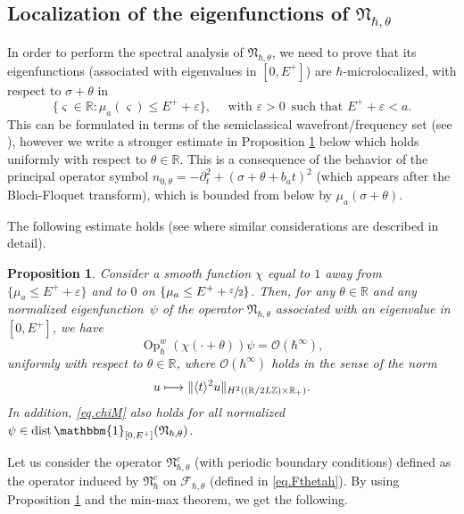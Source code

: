 \documentclass[10pt]{amsart}
\newcommand\mto{\mathchoice{\longmapsto}{\mapsto}{\mapsto}{\mapsto}}
\let\sep:
\let\epsilon\varepsilon
\DeclareMathOperator{\dist}{dist}
\DeclareMathOperator{\Op}{Op}
\let\mathds\mathbbm
\theoremstyle{plain}
\newtheorem{proposition}[theorem]{Proposition}
\theoremstyle{definition}
\newcommand{\R}{\mathbb{R}}
\newcommand{\Z}{\mathbb{Z}}
\begin{document}
\subsection{Localization of the eigenfunctions of $\mathfrak{N}_{\hbar,\theta}$}
In order to perform the spectral analysis of $\mathfrak{N}_{\hbar,\theta}$, we need to prove that its eigenfunctions (associated with eigenvalues in $[0,E^+]$) are $\hbar$-microlocalized, with respect to $\sigma+\theta$ in
\[
\{\varsigma\in\R \sep \mu_a(\varsigma)\leq E^++\epsilon\},\quad \mbox{ with } \epsilon>0\, \mbox{ such that }E^++\epsilon<a.
\]
This can be formulated in terms of the semiclassical wavefront/frequency set (see \cite[\S 8.4.2, p.\,188]{Zworski}), however we write a stronger estimate in Proposition \ref{prop:mlc} below which holds uniformly with respect to $\theta\in\mathbb{R}$. This is a consequence of the behavior of the principal operator symbol $n_{0,\theta}=-\partial^2_t+(\sigma+\theta+b_a t)^2$ (which appears after the Bloch-Floquet transform), which is bounded from below by $\mu_a(\sigma+\theta)$.

The following estimate holds (see \cite[\S 5]{BHR22} where similar considerations are described in detail).

\begin{proposition}\label{prop:mlc}
Consider a smooth function $\chi$ equal to $1$ away from \hbox{$\{\mu_a\!\leq\! E^+\!+\!\epsilon\}$} and to $0$ on $\{\mu_a\leq E^++\sfrac{\epsilon}{2}\}$. Then, for any $\theta\in\mathbb{R}$ and any normalized eigenfunction~$\psi$ of the operator $\mathfrak N_{\hbar, \theta}$ associated with an eigenvalue in $[0,E^+]$, we have
\begin{equation}\label{eq.chiM}
\Op^w_\hbar (\chi(\cdot+\theta))\psi=\mathscr{O}(\hbar^\infty),
\end{equation}
uniformly with respect to $\theta\in\mathbb{R}$, where $\mathscr{O}(\hbar^\infty)$ holds in the sense of the norm
\[
u\mto \|\langle t\rangle^2 u\|_{H^2((\R/2L\Z)\times\R_+)}.
\]
In addition, \eqref{eq.chiM} also holds for all normalized $\psi\in \dist\mathds{1}_{[0,E^+]}(\mathfrak{N}_{\hbar,\theta})$.
\end{proposition}

Let us consider the operator $\mathfrak{N}^c_{\hbar,\theta}$ (with periodic boundary conditions) defined as the operator induced by $\mathfrak{N}^c_{\hbar}$ on $\mathscr{F}_{\hbar, \theta} $ (defined in \eqref{eq.Fthetah}). By using Proposition \ref{prop:mlc} and the min-max theorem, we get the following.
\end{document}
